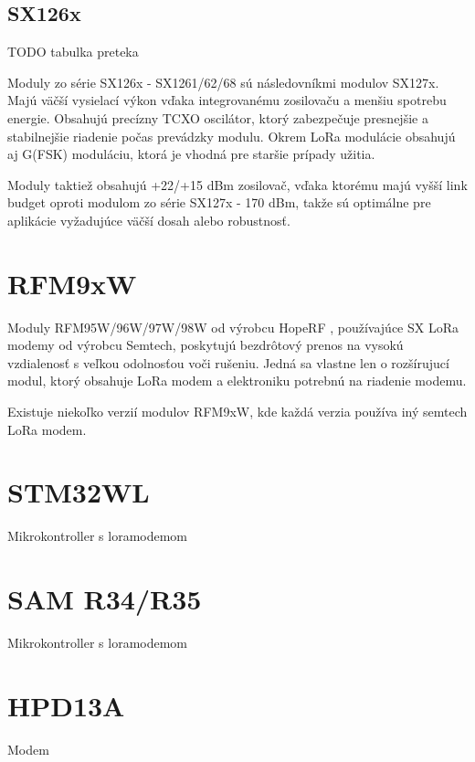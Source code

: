 \documentclass[slovak,master]{diploma}
\begin{document}
\subsection{SX126x}
TODO tabulka preteka

Moduly zo série SX126x - SX1261/62/68 sú následovníkmi modulov SX127x. Majú väčší vysielací výkon vďaka integrovanému zosilovaču a menšiu spotrebu energie. Obsahujú precízny TCXO oscilátor, 
ktorý zabezpečuje presnejšie a stabilnejšie riadenie počas prevádzky modulu. Okrem LoRa modulácie obsahujú aj G(FSK) moduláciu, ktorá je vhodná pre staršie 
prípady užitia.

Moduly taktiež obsahujú +22/+15 dBm zosilovač, vďaka ktorému majú vyšší link budget oproti modulom zo série SX127x - 170 dBm,
takže sú optimálne pre aplikácie vyžadujúce väčší dosah alebo robustnosť.

\section{RFM9xW}
Moduly RFM95W/96W/97W/98W od výrobcu HopeRF \cite{hoperf}, používajúce SX LoRa modemy od výrobcu Semtech, %
 poskytujú bezdrôtový prenos na vysokú vzdialenosť s veľkou odolnosťou voči rušeniu. 
 Jedná sa vlastne len o rozšírujucí modul, ktorý obsahuje LoRa modem a elektroniku potrebnú na riadenie modemu.

Existuje niekoľko verzií modulov RFM9xW, kde každá verzia používa iný semtech LoRa modem.

\section{STM32WL}
Mikrokontroller s loramodemom

\section{SAM R34/R35}
Mikrokontroller s loramodemom

\section{HPD13A}
Modem
\end{document}
